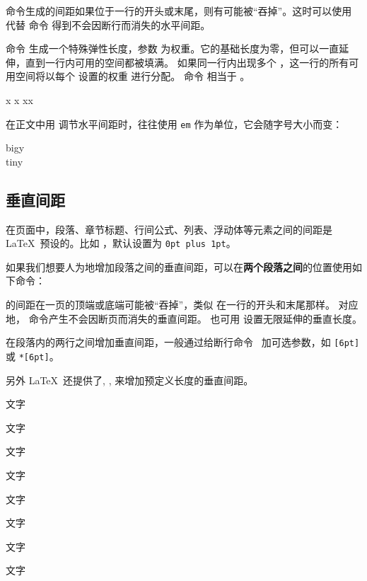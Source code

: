  命令生成的间距如果位于一行的开头或末尾，则有可能被“吞掉”。这时可以使用  代替  命令
得到不会因断行而消失的水平间距。

命令  生成一个特殊弹性长度，参数  为权重。它的基础长度为零，但可以一直延伸，直到一行内可用的空间都被填满。
如果同一行内出现多个 ，这一行的所有可用空间将以每个  设置的权重  进行分配。
命令  相当于 。

\begin{example}
x
x
x\hspace{\fill}x
\end{example}

在正文中用  调节水平间距时，往往使用 \texttt{em} 作为单位，它会随字号大小而变：

\begin{example}
{\Large big\hspace{1em}y}\\
{\tiny tin\hspace{1em}y}
\end{example}

\subsection{垂直间距}\label{subsec:vspace}

在页面中，段落、章节标题、行间公式、列表、浮动体等元素之间的间距是 \LaTeX\ 预设的。比如  ，默认设置为 \texttt{0pt plus 1pt}。

如果我们想要人为地增加段落之间的垂直间距，可以在\textbf{两个段落之间}的位置使用如下命令：
\begin{command}
\end{command}

 的间距在一页的顶端或底端可能被“吞掉”，类似  在一行的开头和末尾那样。
对应地， 命令产生不会因断页而消失的垂直间距。 也可用  设置无限延伸的垂直长度。

在段落内的两行之间增加垂直间距，一般通过给断行命令 \crcmd\ 加可选参数，如 \crcmd\texttt{[6pt]} 或 \crcmd\texttt{*[6pt]}。

另外 \LaTeX\ 还提供了, ,  来增加预定义长度的垂直间距。
\begin{example}
\parbox[t]{3em}{%
  文字\par 文字}
\parbox[t]{3em}{%
  文字\par\smallskip 文字}
\parbox[t]{3em}{%
  文字\par\medskip 文字}
\parbox[t]{3em}{%
  文字\par\bigskip 文字}
\end{example}

